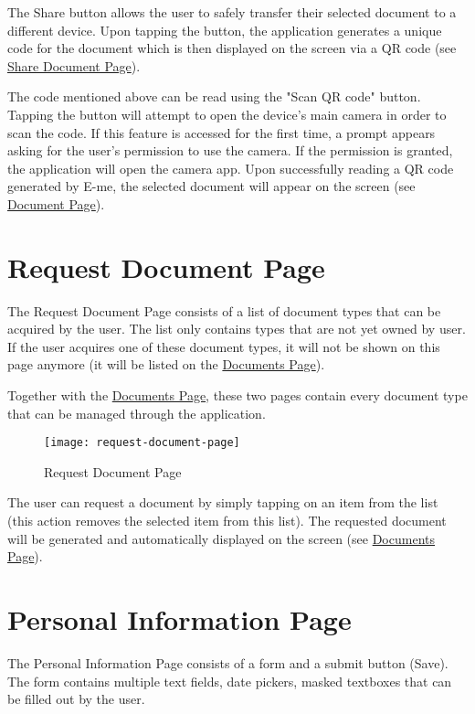 		The Share button allows the user to safely transfer their selected document to a different device.
		Upon tapping the button, the application generates a unique code for the document which is then displayed on the screen via a QR code (see \hyperref[shareDocument]{Share Document Page}).

		The code mentioned above can be read using the "Scan QR code" button. 
		Tapping the button will attempt to open the device's main camera in order to scan the code.
		If this feature is accessed for the first time, a prompt appears asking for the user's permission to use the camera.
		If the permission is granted, the application will open the camera app. 
		Upon successfully reading a QR code generated by E-me, the selected document will appear on the screen (see \hyperref[document]{Document Page}).

	\section{Request Document Page}

	The Request Document Page consists of a list of document types that can be acquired by the user.
	The list only contains types that are not yet owned by user.
	If the user acquires one of these document types, it will not be shown on this page anymore (it will be listed on the \hyperref[documents]{Documents Page}).

	Together with the \hyperref[documents]{Documents Page}, these two pages contain every document type that can be managed through the application. 
		\begin{figure}[H]
			\centering
			\texttt{[image: request-document-page]}				
			\caption{Request Document Page}
		\end{figure}

		The user can request a document by simply tapping on an item from the list (this action removes the selected item from this list). 
		The requested document will be generated and automatically displayed on the screen (see \hyperref[document]{Documents Page}).

	\section{Personal Information Page}

	The Personal Information Page consists of a form and a submit button (Save). 
	The form contains multiple text fields, date pickers, masked textboxes that can be filled out by the user.

